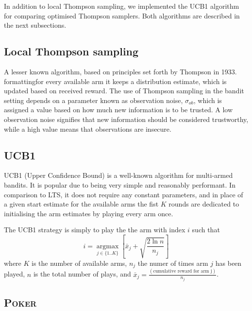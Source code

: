 In addition to local Thompson sampling, we implemented the UCB1 algorithm for 
comparing optimised Thompson samplers. Both algorithms are described in the next 
subsections.

\subsection{Local Thompson sampling}
A lesser known algorithm, based on principles set forth by Thompson in 1933. 
formattingfor every available arm it keeps a distribution estimate, which is 
updated based on received reward. The use of Thompson sampling in the bandit 
setting depends on a parameter known as observation noise, $\sigma_{ob}$, which 
is assigned a value based on how much new information is to be trusted. A low 
observation noise signifies that new information should be considered 
trustworthy, while a high value means that observations are insecure. 

\subsection{UCB1}


UCB1 \cite{Auer02UCB1} (Upper Confidence Bound) is a well-known algorithm for multi-armed bandits.
It is popular due to being very simple and reasonably performant. In comparison 
to LTS, it does not require any constant parameters, and in place of a given 
start estimate for the available arms the fist $K$ rounds are dedicated to 
initialising the arm estimates by playing every arm once.

The UCB1 strategy is simply to play the the arm with index $i$ such that
\begin{displaymath}
    i = \operatorname*{argmax}_{j \in \{ 1..K \}} \left[ \bar{x}_j + 
    \sqrt{\frac{2 \ln{n}}{n_j}} \right]
\end{displaymath}
where $K$ is the number of available arms, $n_j$ the numer of times arm $j$ has 
been played, $n$ is the total number of plays, and $\bar{x}_j 
=\frac{(\text{cumulative reward for arm j})}{n_j}$.

\subsection{\textsc{Poker}}

